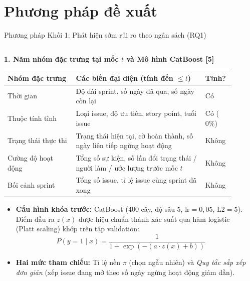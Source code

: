 \section{Phương pháp đề xuất}

\begin{frame}{Phương pháp Khối 1: Phát hiện sớm rủi ro theo ngân sách (RQ1)}
  \scriptsize
  \begin{columns}[T,onlytextwidth]
    \begin{column}{0.48\textwidth}
      \textbf{1. Năm nhóm đặc trưng tại mốc $t$ và Mô hình CatBoost [5]}
      \vspace{0.04cm}
      \setlength{\tabcolsep}{3pt}
      \renewcommand{\arraystretch}{1.12}
      \begin{tabular}{L{0.29\linewidth}|L{0.53\linewidth}|C{0.12\linewidth}}
        \textbf{Nhóm đặc trưng} & \textbf{Các biến đại diện (tính đến $\le t$)} & \textbf{Tĩnh?} \\
        \hline
        Thời gian & Độ dài sprint, số ngày đã qua, số ngày còn lại & Có \\
        Thuộc tính tĩnh & Loại issue, độ ưu tiên, story point, tuổi issue & Có ($0\%$) \\
        Trạng thái thực thi & Trạng thái hiện tại, cờ hoàn thành, \alert{số ngày liên tiếp ngừng hoạt động} & Không \\
        Cường độ hoạt động & Tổng số sự kiện, số lần đổi trạng thái / người làm / ước lượng trước mốc $t$ & Không \\
        Bối cảnh sprint & Tổng số issue, tỉ lệ issue cùng sprint đã xong & Không \\
      \end{tabular}
      \vspace{0.05cm}
      \begin{itemize}
        \setlength{\itemsep}{1.5pt}
        \item \textbf{Cấu hình khóa trước:} CatBoost (400 cây, độ sâu 5, $\text{lr} = 0{,}05$, $\text{L2} = 5$). Điểm đầu ra $z(x)$ được hiệu chuẩn thành xác suất qua hàm logistic (Platt scaling) khớp trên tập validation:
        $$P(y = 1 \mid x) = \frac{1}{1 + \exp(-(a \cdot z(x) + b))}$$
        \item \textbf{Hai mức tham chiếu:} Tỉ lệ nền $\pi$ (chọn ngẫu nhiên) và \emph{Quy tắc sắp xếp đơn giản} (xếp issue đang mở theo số ngày ngừng hoạt động giảm dần).
      \end{itemize}
    \end{column}
    \begin{column}{0.49\textwidth}

\end{column}
\end{columns}
\end{frame}
